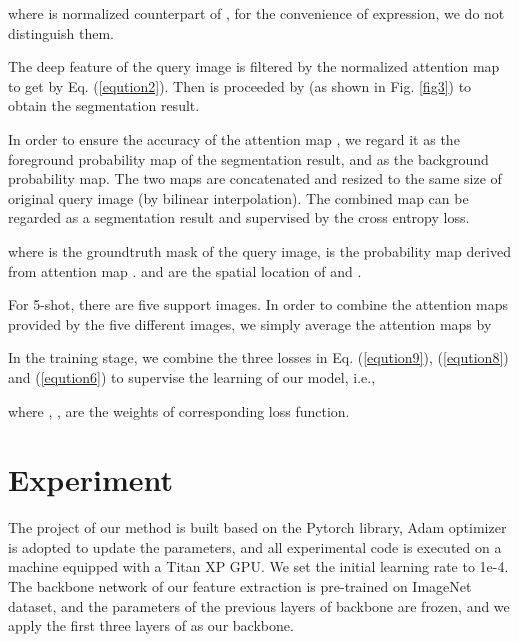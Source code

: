 \documentclass[runningheads]{llncs}
\begin{document}
where  is normalized counterpart of , for the convenience of expression, we do not distinguish them.

The deep feature of the query image  is filtered by the normalized attention map  to get  by Eq. (\ref{eqution2}). Then  is proceeded by  (as shown in Fig. \ref{fig3}) to obtain the segmentation result.


In order to ensure the accuracy of the attention map , we regard it as the foreground probability map of the segmentation result, and  as the background probability map. The two maps are concatenated and resized to the same size of original query image (by bilinear interpolation). The combined map  can be regarded as a segmentation result and supervised by the cross entropy loss.

where  is the groundtruth mask of the query image,  is the probability map derived from attention map .  and  are the spatial location of  and .

For 5-shot, there are five support images. In order to combine the attention maps provided by the five different images, we simply average the attention maps by



In the training stage, we combine the three losses in Eq. (\ref{eqution9}), (\ref{eqution8}) and (\ref{eqution6}) to supervise the learning of our model, i.e., 

where , ,  are the weights of corresponding loss function.


\section{Experiment}

The project of our method is built based on the Pytorch library, Adam\cite{ref_adam} optimizer is adopted to update the parameters, and all experimental code is executed on a machine equipped with a Titan XP GPU. We set the initial learning rate to 1e-4. The backbone network of our feature extraction is pre-trained on ImageNet \cite{ref_imagenet} dataset, and the parameters of the previous layers of backbone are frozen, and we apply the first three layers of  \cite{ref_resnet} as our backbone.
\end{document}
